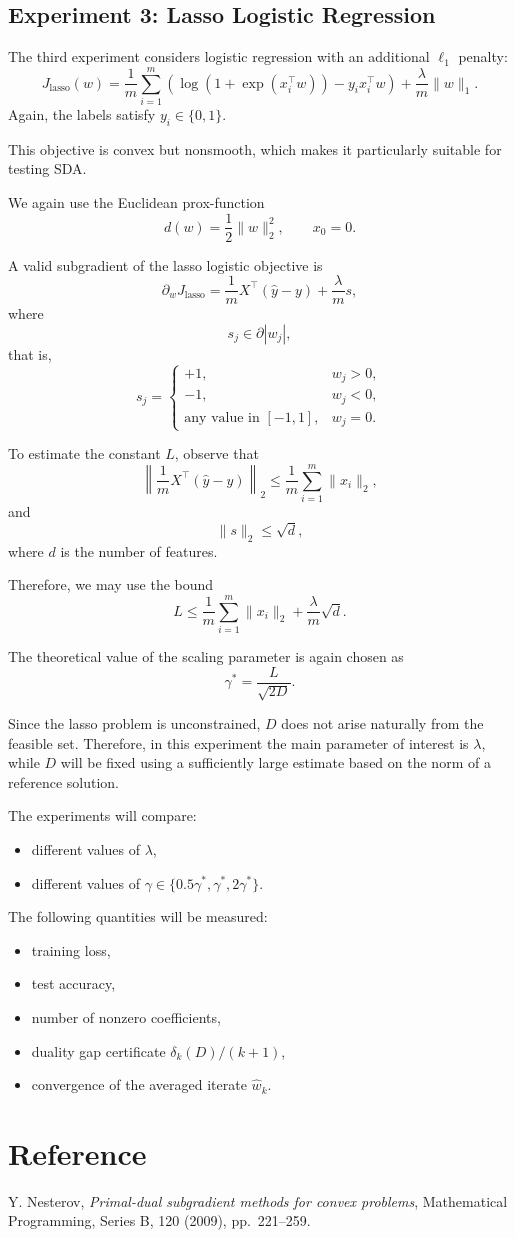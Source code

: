 \documentclass[12pt,a4paper]{article}
\begin{document}
\subsection{Experiment 3: Lasso Logistic Regression}

The third experiment considers logistic regression with an additional $\ell_1$ penalty:
\[
J_{\mathrm{lasso}}(w)=
\frac1m\sum_{i=1}^m
\left(\log\left(1+\exp(x_i^\top w)\right)-y_i x_i^\top w\right)
+
\frac{\lambda}{m}\|w\|_1.
\]
Again, the labels satisfy $y_i\in\{0,1\}$.

This objective is convex but nonsmooth, which makes it particularly suitable for testing SDA.

We again use the Euclidean prox-function
\[
d(w)=\frac12\|w\|_2^2,
\qquad x_0=0.
\]

A valid subgradient of the lasso logistic objective is
\[
\partial_w J_{\mathrm{lasso}}
=
\frac1m X^\top(\hat y-y)
+
\frac{\lambda}{m}s,
\]
where
\[
s_j\in \partial |w_j|,
\]
that is,
\[
s_j=
\begin{cases}
+1, & w_j>0,\\
-1, & w_j<0,\\
\text{any value in }[-1,1], & w_j=0.
\end{cases}
\]

To estimate the constant $L$, observe that
\[
\left\|\frac1m X^\top(\hat y-y)\right\|_2
\le
\frac1m\sum_{i=1}^m \|x_i\|_2,
\]
and
\[
\|s\|_2\le \sqrt{d},
\]
where $d$ is the number of features.

Therefore, we may use the bound
\[
L
\le
\frac1m\sum_{i=1}^m \|x_i\|_2
+
\frac{\lambda}{m}\sqrt{d}.
\]

The theoretical value of the scaling parameter is again chosen as
\[
\gamma^*=\frac{L}{\sqrt{2D}}.
\]

Since the lasso problem is unconstrained, $D$ does not arise naturally from the feasible set. Therefore, in this experiment the main parameter of interest is $\lambda$, while $D$ will be fixed using a sufficiently large estimate based on the norm of a reference solution.

The experiments will compare:
\begin{itemize}
\item different values of $\lambda$,
\item different values of $\gamma\in\{0.5\gamma^*,\gamma^*,2\gamma^*\}$.
\end{itemize}

The following quantities will be measured:
\begin{itemize}
\item training loss,
\item test accuracy,
\item number of nonzero coefficients,
\item duality gap certificate $\delta_k(D)/(k+1)$,
\item convergence of the averaged iterate $\hat w_k$.
\end{itemize}


\section*{Reference}
Y. Nesterov, \emph{Primal-dual subgradient methods for convex problems}, Mathematical Programming, Series B, 120 (2009), pp.~221--259.
\end{document}
